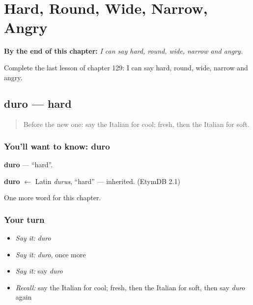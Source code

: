 
\chapter{Hard, Round, Wide, Narrow, Angry}
\label{ch:it-hard-round-wide-narrow-angry}

\begin{chapteropening}
\textbf{By the end of this chapter:} \emph{I can say hard, round, wide, narrow and angry.}

Complete the last lesson of chapter 129: I can say hard, round, wide, narrow and angry.
\end{chapteropening}

\section[duro]{duro — hard}

\label{lesson:IT-C129-duro}



\begin{quote}
Before the new one: say the Italian for cool; fresh, then the Italian for soft.
\end{quote}

\subsection*{You'll want to know: duro}
\textbf{duro} — \textquotedblleft{}hard\textquotedblright{}.

\begin{cousinweb}
\textbf{duro} $\leftarrow$ Latin \emph{durus}, \textquotedblleft{}hard\textquotedblright{} — inherited. (EtymDB 2.1)
\end{cousinweb}

\begin{grammarlens}[title={What you've built}]
One more word for this chapter.
\end{grammarlens}

\subsection*{Your turn}
\begin{itemize}
\raggedright
  \item \emph{Say it:} \emph{duro}
  \item \emph{Say it:} \emph{duro}, once more
  \item \emph{Say it:} say \emph{duro}
  \item \emph{Recall:} say the Italian for cool; fresh, then the Italian for soft, then say \emph{duro} again
\end{itemize}

